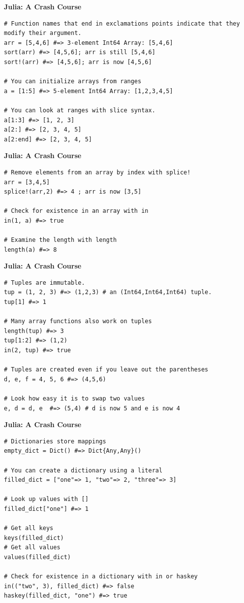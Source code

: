 \documentclass[xcolor=dvipsnames]{beamer}
\begin{document}
\begin{frame}[fragile]
{\bf Julia: A Crash Course}
\begin{lstlisting}
# Function names that end in exclamations points indicate that they modify their argument.
arr = [5,4,6] #=> 3-element Int64 Array: [5,4,6]
sort(arr) #=> [4,5,6]; arr is still [5,4,6]
sort!(arr) #=> [4,5,6]; arr is now [4,5,6]

# You can initialize arrays from ranges
a = [1:5] #=> 5-element Int64 Array: [1,2,3,4,5]

# You can look at ranges with slice syntax.
a[1:3] #=> [1, 2, 3]
a[2:] #=> [2, 3, 4, 5]
a[2:end] #=> [2, 3, 4, 5]
\end{lstlisting}
\end{frame}

\begin{frame}[fragile]
{\bf Julia: A Crash Course}
\begin{lstlisting}
# Remove elements from an array by index with splice!
arr = [3,4,5]
splice!(arr,2) #=> 4 ; arr is now [3,5]

# Check for existence in an array with in
in(1, a) #=> true

# Examine the length with length
length(a) #=> 8
\end{lstlisting}
\end{frame}

\begin{frame}[fragile]
{\bf Julia: A Crash Course}
\begin{lstlisting}
# Tuples are immutable.
tup = (1, 2, 3) #=> (1,2,3) # an (Int64,Int64,Int64) tuple.
tup[1] #=> 1

# Many array functions also work on tuples
length(tup) #=> 3
tup[1:2] #=> (1,2)
in(2, tup) #=> true

# Tuples are created even if you leave out the parentheses
d, e, f = 4, 5, 6 #=> (4,5,6)

# Look how easy it is to swap two values
e, d = d, e  #=> (5,4) # d is now 5 and e is now 4
\end{lstlisting}
\end{frame}

\begin{frame}[fragile]
{\bf Julia: A Crash Course}
\begin{lstlisting}
# Dictionaries store mappings
empty_dict = Dict() #=> Dict{Any,Any}()

# You can create a dictionary using a literal
filled_dict = ["one"=> 1, "two"=> 2, "three"=> 3]

# Look up values with []
filled_dict["one"] #=> 1

# Get all keys
keys(filled_dict)
# Get all values
values(filled_dict)

# Check for existence in a dictionary with in or haskey
in(("two", 3), filled_dict) #=> false
haskey(filled_dict, "one") #=> true
\end{lstlisting}
\end{frame}
\end{document}
